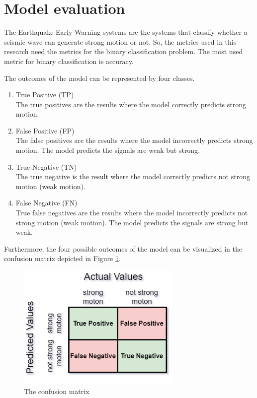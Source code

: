 \section{Model evaluation}
The Earthquake Early Warning systems are the systems that classify whether a seismic wave can generate strong motion or not. So, the metrics used in this research need the metrics for the binary classification problem\cite{chiang2022neural}. The most used metric for binary classification is accuracy. 

The outcomes of the model can be represented by four classes. 
\begin{enumerate}
    \item True Positive (TP)\\
    The true positives are the results where the model correctly predicts strong motion. 

    \item False Positive (FP)\\
    The false positives are the results where the model incorrectly predicts strong motion. The model predicts the signals are weak but strong.

    \item True Negative (TN)\\
    The true negative is the result where the model correctly predicts not strong motion (weak motion).

    \item False Negative (FN)\\
    True false negatives are the results where the model incorrectly predicts not strong motion (weak motion). The model predicts the signals are strong but weak.
\end{enumerate}

Furthermore, the four possible outcomes of the model can be visualized in the confusion matrix depicted in Figure \ref{fig:conf-mat}.
\begin{figure}[b]
    \centering
    \includegraphics[width=0.7\textwidth]{img/binary-conf-mat.png}
    \caption{The confusion matrix}
    \label{fig:conf-mat}
\end{figure}

